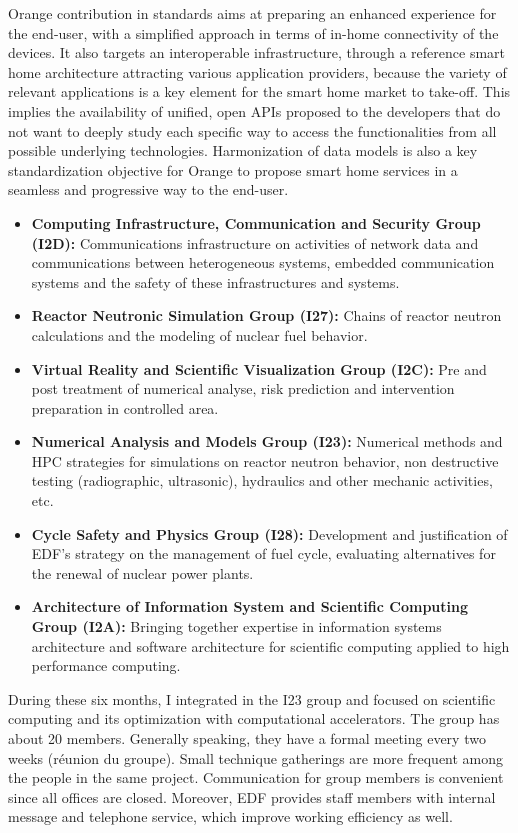 Orange contribution in standards aims at preparing an enhanced experience for the end-user, with a simplified approach in terms of in-home connectivity of the devices. It also targets an interoperable infrastructure, through a reference smart home architecture attracting various application providers, because the variety of relevant applications is a key element for the smart home market to take-off. This implies the availability of unified, open APIs proposed to the developers that do not want to deeply study each specific way to access the functionalities from all possible underlying technologies. Harmonization of data models is also a key standardization objective for Orange to propose smart home services in a seamless and progressive way to the end-user.
\begin{itemize}
  \it
  \item \textbf{Computing Infrastructure, Communication and Security Group (I2D): }Communications infrastructure on activities of network data and communications between heterogeneous systems, embedded communication systems and the safety of these infrastructures and systems.
  \item \textbf{Reactor Neutronic Simulation Group (I27):} Chains of reactor neutron calculations and the modeling of nuclear fuel behavior.
  \item \textbf{Virtual Reality and Scientific Visualization Group (I2C):} Pre and post treatment of numerical analyse, risk prediction and intervention preparation in controlled area.
	\item \textbf{Numerical Analysis and Models Group (I23):} Numerical methods and HPC strategies  for simulations on reactor neutron behavior, non destructive testing (radiographic, ultrasonic), hydraulics and other mechanic activities, etc.
	\item \textbf{Cycle Safety and Physics Group (I28):} Development and justification of EDF's strategy on the management of fuel cycle, evaluating alternatives for the renewal of nuclear power plants.
	\item \textbf{Architecture of Information System and Scientific Computing Group (I2A):} Bringing together expertise in information systems architecture and software architecture for scientific computing applied to high performance computing.
\end{itemize}
During these six months, I integrated in the I23 group and focused on scientific computing and its optimization with computational accelerators. The group has about 20 members. Generally speaking, they have a formal meeting every two weeks (réunion du groupe). Small technique gatherings are more frequent among the people in the same project. Communication for group members is convenient since all offices are closed. Moreover, EDF provides staff members with internal message and telephone service, which improve working efficiency as well.

